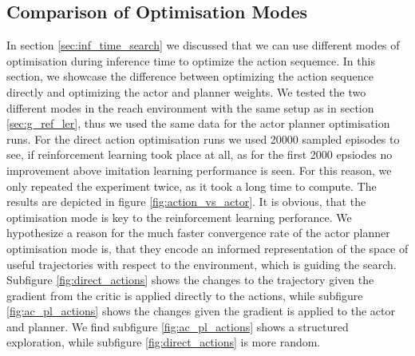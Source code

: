 \subsection{Comparison of Optimisation Modes}
\label{ref:com_opt_modes}
In section \ref{sec:inf_time_search} we discussed that we can use different modes of optimisation during inference time to optimize the action sequemce. In this section, 
we showcase the difference between optimizing the action sequence directly and optimizing the actor and planner weights. We tested the two different 
modes in the reach environment with the same setup as in section \ref{sec:g_ref_ler}, thus we used the same data for the actor planner optimisation runs. For the direct 
action optimisation runs we used 20000 sampled episodes to see, if reinforcement learning took place at all, as for the first 2000 epsiodes no improvement above 
imitation learning performance is seen. For this reason, we only repeated the experiment twice, as it took a long time to compute. The results are depicted in figure 
\ref{fig:action_vs_actor}. It is obvious, that the optimisation mode is key to the reinforcement learning perforance. We hypothesize a reason for the much 
faster convergence rate of the actor planner optimisation mode is, that they encode an informed representation of the space of useful trajectories with 
respect to the environment, which is guiding the search. Subfigure \ref{fig:direct_actions} shows the changes to the trajectory given the gradient from the critic is applied 
directly to the actions, while subfigure \ref{fig:ac_pl_actions} shows the changes given the gradient is applied to the actor and planner. We find 
subfigure \ref{fig:ac_pl_actions} shows a structured exploration, while subfigure \ref{fig:direct_actions} is more random. 

